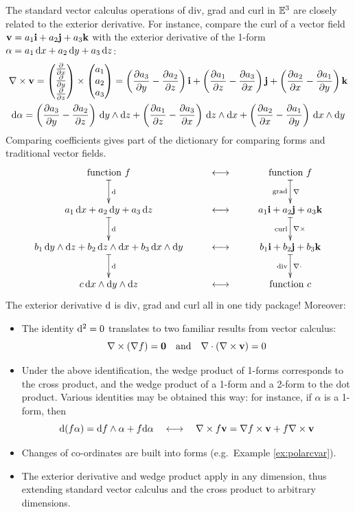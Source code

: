 
The standard vector calculus operations of div, grad and curl in $\E^3$ are closely related to the exterior derivative. For instance, compare the curl of a vector field $\vv=a_1\vi+a_2\vj+a_3\vk$ with the exterior derivative of the 1-form $\alpha=a_1\,\dx+a_2\,\dy+a_3\,\dz$:
\begin{gather*}
	\nabla\times\vv=
	\threevec{\partials{x}}{\partials{y}}{\partials{z}}\times\threevec{a_1}{a_2}{a_3}
	=\left(\partials[a_3]{y}-\partials[a_2]{z}\right)\vi+ \left(\partials[a_1]{z}-\partials[a_3]{x}\right)\vj+ \left(\partials[a_2]{x}-\partials[a_1]{y}\right)\vk\\
	\D\alpha=\left(\partials[a_3]{y}-\partials[a_2]{z}\right)\,\dy\wedge\dz +\left(\partials[a_1]{z}-\partials[a_3]{x}\right)\,\dz\wedge\dx +\left(\partials[a_2]{x}-\partials[a_1]{y}\right)\,\dx\wedge\dy
\end{gather*}
Comparing coefficients gives part of the dictionary for comparing forms and traditional vector fields.
\[
	\xymatrix{
		\text{function }f \ar@{|->}[d]^{\D} & \longleftrightarrow & \text{function }f \ar@{|->}[d]^{\nabla}_{\text{grad}}\\
		a_1\,\dx+a_2\,\dy+a_3\,\dz \ar@{|->}[d]^{\D} & \longleftrightarrow & a_1\vi+a_2\vj+ a_3\vk \ar@{|->}[d]^{\nabla\times}_{\text{curl}}\\
		b_1\,\dy\wedge\dz+b_2\,\dz\wedge\dx+b_3\,\dx\wedge\dy \ar@{|->}[d]^{\D} & \longleftrightarrow & b_1\vi+b_2\vj+b_3\vk \ar@{|->}[d]^{\nabla\cdot}_{\text{div}}\\
		c\,\dx\wedge\dy\wedge\dz & \longleftrightarrow & \text{function }c
	}
\]
The exterior derivative $\D$ is div, grad and curl all in one tidy package! Moreover:

\begin{itemize}
  \item The identity $\D^2=0$ translates to two familiar results from vector calculus:
  \[
  	\nabla\times(\nabla f)=\V0\quad\text{and}\quad\nabla\cdot(\nabla\times\vv)=0
  \]
  
  \item Under the above identification, the wedge product of 1-forms corresponds to the cross product, and the wedge product of a 1-form and a 2-form to the dot product. Various identities may be obtained this way: for instance, if $\alpha$ is a 1-form, then
  \[
  	\D(f\alpha)=\df\wedge\alpha+f\D\alpha \quad\longleftrightarrow
\quad\nabla\times f\vv=\nabla f\times\vv+f\nabla\times\vv
	\]
	 	
  \item Changes of co-ordinates are built into forms (e.g.\ Example \ref{ex:polarcvar}).
  
  \item The exterior derivative and wedge product apply in any dimension, thus extending standard vector calculus and the cross product to arbitrary dimensions. 
\end{itemize}


